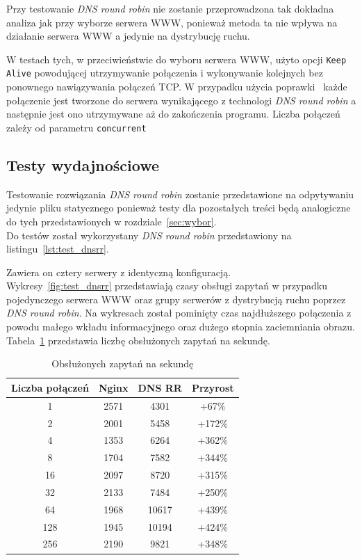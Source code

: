 Przy testowanie \textit{DNS round robin} nie zostanie przeprowadzona tak dokładna analiza jak przy wyborze serwera WWW, ponieważ metoda ta nie wpływa na działanie serwera WWW a jedynie na dystrybucję ruchu.

W testach tych, w przeciwieństwie do wyboru serwera WWW, użyto opcji \texttt{Keep Alive} powodującej utrzymywanie połączenia i wykonywanie kolejnych bez ponownego nawiązywania połączeń TCP\@.
W przypadku użycia poprawki~\cite{ab_dnsrr} każde połączenie jest tworzone do serwera wynikającego z technologi \textit{DNS round robin} a następnie jest ono utrzymywane aż do zakończenia programu. Liczba połączeń zależy od parametru \texttt{concurrent}
\subsection{Testy wydajnościowe}
Testowanie rozwiązania \textit{DNS round robin} zostanie przedstawione na odpytywaniu jedynie pliku statycznego ponieważ testy dla pozostałych treści będą analogiczne do tych przedstawionych w rozdziale~\ref{sec:wybor}.\\
Do testów został wykorzystany \textit{DNS round robin} przedstawiony na listingu~\ref{lst:test_dnsrr}.

Zawiera on cztery serwery z identyczną konfiguracją.\\
Wykresy~\ref{fig:test_dnsrr} przedstawiają czasy obsługi zapytań w przypadku pojedynczego serwera WWW oraz grupy serwerów z dystrybucją ruchu poprzez \textit{DNS round robin}.
Na wykresach został pominięty czas najdłuższego połączenia z powodu małego wkładu informacyjnego oraz dużego stopnia zaciemniania obrazu.
Tabela~\ref{tab:test_dnsrr} przedstawia liczbę obsłużonych zapytań na sekundę.
\begin{table}[h]
\centering
\begin{tabular}{cccc}
	\toprule
	Liczba połączeń & Nginx & DNS RR & Przyrost\\
	\midrule
	\midrule
	1&2571&4301& +67\%\\
	\midrule
	2&2001&5458& +172\%\\
	\midrule
	4&1353&6264& +362\%\\
	\midrule
	8&1704&7582& +344\%\\
	\midrule
	16&2097&8720& +315\%\\
	\midrule
	32&2133&7484& +250\%\\
	\midrule
	64&1968&10617& +439\%\\
	\midrule
	128&1945&10194& +424\%\\
	\midrule
	256&2190&9821& +348\%\\
	\bottomrule
\end{tabular}
\caption{Obsłużonych zapytań na sekundę}
\label{tab:test_dnsrr}
\end{table}
